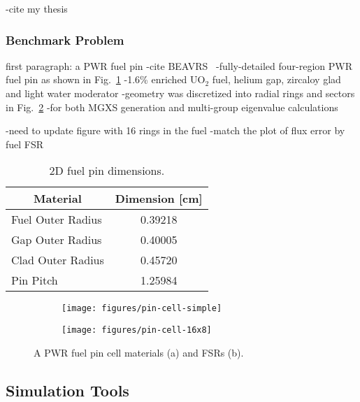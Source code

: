 -cite my thesis~\cite{boyd2016thesis}


\subsubsection{Benchmark Problem}
\label{subsubsec:benchmark-case2}

first paragraph: a PWR fuel pin
-cite BEAVRS~\cite{horelik2013beavrs}
-fully-detailed four-region PWR fuel pin as shown in Fig.~\ref{fig:pin-materials}
  -1.6\% enriched UO$_2$ fuel, helium gap, zircaloy glad and light water moderator
-geometry was discretized into radial rings and sectors in Fig.~\ref{fig:pin-fsrs}
  -for both MGXS generation and multi-group eigenvalue calculations

-need to update figure with 16 rings in the fuel
  -match the plot of flux error by fuel FSR

\begin{table}[H]
  \centering
  \caption{2D fuel pin dimensions.}
  \label{table:pin-dimensions} 
  \begin{tabular}{l c}
  \toprule
  \multicolumn{1}{c}{\bf Material} &
  {\bf Dimension [cm]} \\
  \midrule
  Fuel Outer Radius & 0.39218 \\
  Gap Outer Radius &  0.40005 \\
  Clad Outer Radius & 0.45720 \\
  Pin Pitch &         1.25984 \\
  \bottomrule
\end{tabular}
\end{table}

\begin{figure}[h!]
\centering
\begin{subfigure}{.25\textwidth}
  \texttt{[image: figures/pin-cell-simple]}
  \caption{}
  \label{fig:pin-materials}
\end{subfigure}%
\begin{subfigure}{.25\textwidth}
  \centering
  \texttt{[image: figures/pin-cell-16x8]}
  \caption{}
  \label{fig:pin-fsrs}
\end{subfigure}
\caption{A PWR fuel pin cell materials (a) and FSRs (b).}
\label{fig:pin-cell}
\end{figure}


\subsection{Simulation Tools}
\label{subsubsec:sim-tools-case2}

